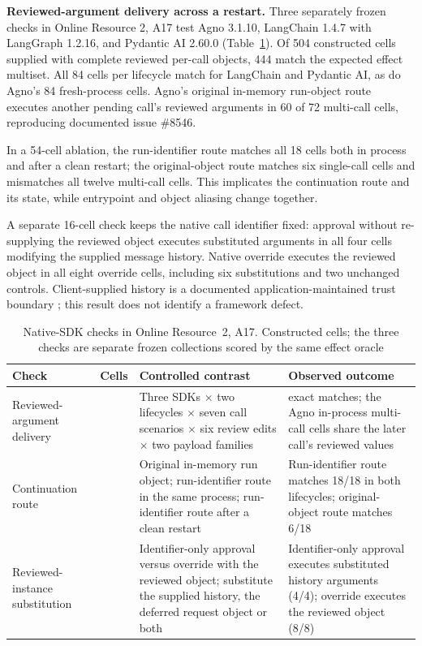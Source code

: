 \documentclass[pdflatex,sn-basic]{sn-jnl}
\begin{document}
\textbf{Reviewed-argument delivery across a restart.} Three separately frozen checks in Online Resource 2, A17 test Agno 3.1.10, LangChain 1.4.7 with LangGraph 1.2.16, and Pydantic AI 2.60.0 (Table~\ref{tab:sdk-checks}). Of 504 constructed cells supplied with complete reviewed per-call objects, 444 match the expected effect multiset. All 84 cells per lifecycle match for LangChain and Pydantic AI, as do Agno's 84 fresh-process cells. Agno's original in-memory run-object route executes another pending call's reviewed arguments in 60 of 72 multi-call cells, reproducing documented issue \#8546.

In a 54-cell ablation, the run-identifier route matches all 18 cells both in process and after a clean restart; the original-object route matches six single-call cells and mismatches all twelve multi-call cells. This implicates the continuation route and its state, while entrypoint and object aliasing change together.

A separate 16-cell check keeps the native call identifier fixed: approval without re-supplying the reviewed object executes substituted arguments in all four cells modifying the supplied message history. Native override executes the reviewed object in all eight override cells, including six substitutions and two unchanged controls. Client-supplied history is a documented application-maintained trust boundary \citep{pydantic-ai-docs}; this result does not identify a framework defect.

\begin{table}[htbp]
\centering\small
\caption{Native-{SDK} checks in Online Resource~2, A17. Constructed cells; the three checks are separate frozen collections scored by the same effect oracle}
\label{tab:sdk-checks}
\begin{tabularx}{\textwidth}{@{}>{\raggedright\arraybackslash}p{}>{\raggedright\arraybackslash}p{}>{\raggedright\arraybackslash}X>{\raggedright\arraybackslash}p{}@{}}
\toprule
Check & Cells & Controlled contrast & Observed outcome \\
\midrule
Reviewed-argument delivery & 504 & Three {SDK}s $\times$ two lifecycles $\times$ seven call scenarios $\times$ six review edits $\times$ two payload families & 444 exact matches; the Agno in-process multi-call cells share the later call's reviewed values \\
Continuation route & 54 & Original in-memory run object; run-identifier route in the same process; run-identifier route after a clean restart & Run-identifier route matches 18/18 in both lifecycles; original-object route matches 6/18 \\
Reviewed-instance substitution & 16 & Identifier-only approval versus override with the reviewed object; substitute the supplied history, the deferred request object or both & Identifier-only approval executes substituted history arguments (4/4); override executes the reviewed object (8/8) \\
\bottomrule
\end{tabularx}
\end{table}
\end{document}
